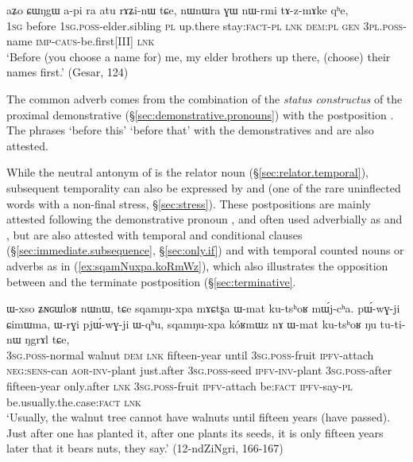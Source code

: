 \begin{exe}
\ex \label{ex:aʑo.CWNgW}
 \gll  aʑo ɕɯŋgɯ a-pi ra atu rɤʑi-nɯ tɕe, nɯnɯra ɣɯ nɯ-rmi tɤ-z-mɤke qʰe, \\
 \textsc{1sg} before \textsc{1sg}.\textsc{poss}-elder.sibling \textsc{pl} up.there stay:\textsc{fact}-\textsc{pl} \textsc{lnk} \textsc{dem}:\textsc{pl} \textsc{gen} \textsc{3pl}.\textsc{poss}-name \textsc{imp}-\textsc{caus}-be.first[III] \textsc{lnk} \\
 \glt `Before (you choose a name for) me, my elder brothers up there, (choose) their names first.' (Gesar, 124)
\end{exe}


The common adverb  comes from the combination of the \textit{status constructus} of the proximal demonstrative  (§\ref{sec:demonstrative.pronouns}) with the postposition . The phrases  `before this'  `before that' with the demonstratives  and   are also attested.

While the neutral antonym of  is the relator noun  (§\ref{sec:relator.temporal}), subsequent temporality can also be expressed by  and  (one of the rare uninflected words with a non-final stress, §\ref{sec:stress}). These postpositions are mainly attested following the demonstrative pronoun , and often used adverbially as  and , but are also attested with temporal and conditional clauses (§\ref{sec:immediate.subsequence}, §\ref{sec:only.if}) and with temporal counted nouns or adverbs as in (\ref{ex:sqamNuxpa.koRmWz}), which also illustrates the opposition between  and the terminate postposition  (§\ref{sec:terminative}. 

\begin{exe}
\ex \label{ex:sqamNuxpa.koRmWz}
\gll ɯ-xso ʑɴɢɯloʁ nɯnɯ, tɕe sqamŋu-xpa mɤɕtʂa ɯ-mat ku-tsʰoʁ mɯ́j-cʰa. pɯ́-wɣ-ji ɕimɯma, ɯ-rɣi pjɯ́-wɣ-ji ɯ-qʰu,  sqamŋu-xpa kóʁmɯz nɤ ɯ-mat ku-tsʰoʁ ŋu tu-ti-nɯ ŋgrɤl tɕe,  \\
\textsc{3sg}.\textsc{poss}-normal walnut  \textsc{dem} \textsc{lnk} fifteen-year until \textsc{3sg}.\textsc{poss}-fruit \textsc{ipfv}-attach \textsc{neg}:\textsc{sens}-can \textsc{aor}-\textsc{inv}-plant just.after \textsc{3sg}.\textsc{poss}-seed \textsc{ipfv}-\textsc{inv}-plant \textsc{3sg}.\textsc{poss}-after fifteen-year only.after \textsc{lnk} \textsc{3sg}.\textsc{poss}-fruit \textsc{ipfv}-attach be:\textsc{fact} \textsc{ipfv}-say-\textsc{pl} be.usually.the.case:\textsc{fact} \textsc{lnk} \\
\glt `Usually, the walnut tree cannot have walnuts until fifteen years (have passed). Just after one has planted it, after one plants its seeds, it is only fifteen years later that it bears nuts, they say.' (12-ndZiNgri, 166-167)
\end{exe}


